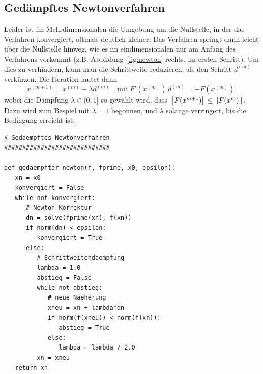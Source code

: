 \subsection{Gedämpftes Newtonverfahren}

Leider ist im Mehrdimensionalen die Umgebung um die Nullstelle, in der
das Verfahren konvergiert, oftmals deutlich kleiner. Das Verfahren
springt dann leicht über die Nullstelle hinweg, wie es im
eindimensionalen nur am Anfang des Verfahrens vorkommt
(z.B. Abbildung~\ref{fig:newton} rechts, im ersten Schritt). Um dies
zu verhindern, kann man die Schrittweite reduzieren, als den Schritt
$d^{(m)}$ verkürzen. Die Iteration lautet dann
\begin{equation}
  x^{(m+1)} = x^{(m)} + \lambda d^{(m)}\quad\text{mit}\;
  F'(x^{(m)})\,d^{(m)} = -F(x^{(m)}),
\end{equation}
wobei die Dämpfung $\lambda\in (0,1]$ so gewählt wird, dass
$\left\lVert{F(x^{m+1})}\right\rVert\le\left\lVert{F(x^{m})}\right\rVert$. Dazu wird zum Bespiel mit
$\lambda=1$ begonnen, und $\lambda$ solange verringert, bis die
Bedingung erreicht ist.

\begin{lstlisting}[style=floating,deletekeywords={lambda},
caption={Gedämpftes Newtonverfahren in mehreren
Dimensionen. \lstinline!f(x)! muß
eine vektorwertige Funktion sein, \lstinline!fprime(x)! ihre
Ableitung, d.h. eine matrixwertige Funktion.}]
# Gedaempftes Newtonverfahren
#############################

def gedaempfter_newton(f, fprime, x0, epsilon):
   xn = x0
   konvergiert = False
   while not konvergiert:
      # Newton-Korrektur
      dn = solve(fprime(xn), f(xn))
      if norm(dn) < epsilon:
         konvergiert = True
      else:
         # Schrittweitendaempfung
         lambda = 1.0
         abstieg = False
         while not abstieg:
            # neue Naeherung
            xneu = xn + lambda*dn
            if norm(f(xneu)) < norm(f(xn)):
               abstieg = True
            else:
               lambda = lambda / 2.0
         xn = xneu
   return xn
\end{lstlisting}


